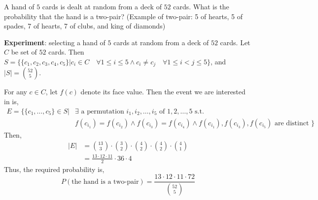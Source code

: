 \begin{example}
    A hand of $5$ cards is dealt at random from a deck of $52$ cards. What is
the probability that the hand is a two-pair? (Example of two-pair: 5 of hearts,
5 of spades, 7 of hearts, 7 of clubs, and king of diamonds)
\end{example}
\begin{solution}
    \textbf{Experiment}: selecting a hand of $5$ cards at random from a deck of
$52$ cards. Let $C$ be set of $52$ cards. Then $S = \lbrace \lbrace c_1, c_2,
c_3, c_4, c_5 \rbrace \vert c_i \in C \quad \forall 1 \leq i \leq 5 \land c_i
\neq c_j \quad \forall 1 \leq i < j \leq 5 \rbrace$, and $\vert S \vert = {52
\choose 5}$.

    For any $c \in C$, let $f(c)$ denote its face value. Then the event we are
interested in is, 
\begin{align*}
    E = \lbrace \lbrace c_1, \dots, c_5 \rbrace \in S \vert
        & \exists \text{ a permutation } i_1, i_2, \dots, i_5 \text{ of } 
        1, 2, \dots, 5 \text{ s.t. }                                         \\
        & f(c_{i_1}) = f(c_{i_2}) \land
        f(c_{i_3}) = f(c_{i_4}) \land
        f(c_{i_1}), f(c_{i_3}), f(c_{i_5}) \text{ are distinct }
        \rbrace
\end{align*}
Then, 
\begin{align*}
    \vert E \vert &= {13 \choose 3} \cdot {3 \choose 2} \cdot {4 \choose 2}
                     \cdot {4 \choose 2} \cdot {4 \choose 1}                 \\
                  &= \frac{13 \cdot 12 \cdot 11}{2} \cdot 36 \cdot 4
\end{align*}
Thus, the required probability is, 
\begin{equation*}
    P(\text{the hand is a two-pair}) = \frac{13 \cdot 12 \cdot 11 \cdot
                                       72}{{52 \choose 5}}
\end{equation*}
\end{solution}